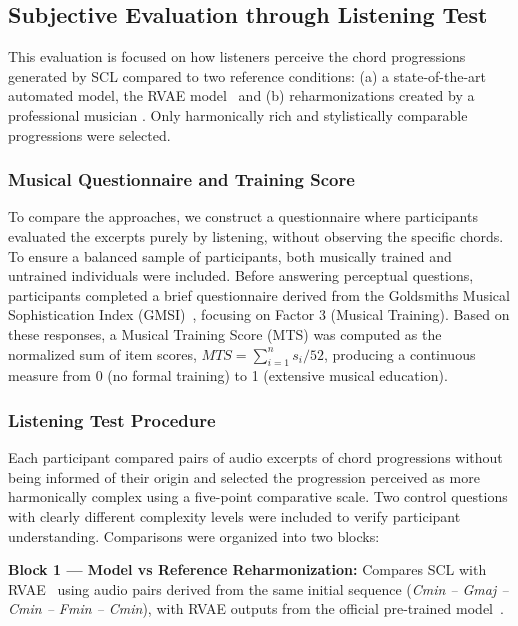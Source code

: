 \documentclass[conference]{IEEEtran}
\begin{document}
\subsection{Subjective Evaluation through Listening Test}
This evaluation is focused on how listeners perceive the chord progressions generated by SCL compared to two reference conditions: (a) a state-of-the-art automated model, the RVAE model~\cite{comanducci2023vae} and (b) reharmonizations created by a professional musician \cite{rittor2019}. Only harmonically rich and stylistically comparable progressions were selected. %
\subsubsection{Musical Questionnaire and Training Score}
To compare the approaches, we construct a questionnaire where participants evaluated the excerpts purely by listening, without observing the specific chords.
To ensure a balanced sample of participants, both musically trained and untrained individuals were included. Before answering perceptual questions, participants completed a brief questionnaire derived from the Goldsmiths Musical Sophistication Index (GMSI)~\cite{mullensiefen2014musicality}, focusing on Factor 3 (Musical Training). Based on these responses, a Musical Training Score (MTS) was computed as the normalized sum of item scores, $MTS = \sum_{i=1}^{n} s_i/52$, producing a continuous measure from 0 (no formal training) to 1 (extensive musical education).
\subsubsection{Listening Test Procedure}
Each participant compared pairs of audio excerpts of chord progressions without being informed of their origin and selected the progression perceived as more harmonically complex using a five-point comparative scale. Two control questions with clearly different complexity levels were included to verify participant understanding. Comparisons were organized into two blocks: 

\textbf{Block 1 — Model vs Reference Reharmonization:} Compares SCL with RVAE~\cite{comanducci2023vae} using audio pairs derived from the same initial sequence (\textit{Cmin – Gmaj – Cmin – Fmin – Cmin}), with RVAE outputs from the official pre-trained model~\cite{rvaeresources}.
\end{document}
